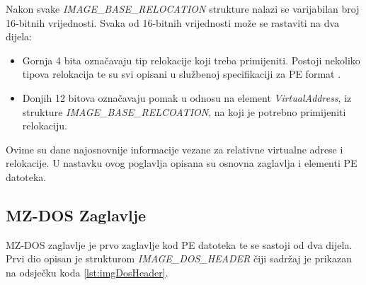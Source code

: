 \documentclass[times, utf8, diplomski, numeric]{fer}
\begin{document}
Nakon svake \emph{IMAGE\_BASE\_RELOCATION} strukture nalazi se varijabilan broj 16-bitnih vrijednosti. Svaka od 16-bitnih vrijednosti može se rastaviti na dva dijela:
\begin{itemize}
\item Gornja 4 bita označavaju tip relokacije koji treba primijeniti. Postoji nekoliko tipova relokacija te su svi opisani u službenoj specifikaciji za PE format \citep{pe_spec}.
\item Donjih 12 bitova označavaju pomak u odnosu na element \emph{VirtualAddress}, iz strukture \emph{IMAGE\_BASE\_RELCOATION}, na koji je potrebno primijeniti relokaciju.
\end{itemize}
Ovime su dane najosnovnije informacije vezane za relativne virtualne adrese i relokacije. U nastavku ovog poglavlja opisana su osnovna zaglavlja i elementi PE datoteka.

\pagebreak
\subsection{MZ-DOS Zaglavlje}
MZ-DOS zaglavlje je prvo zaglavlje kod PE datoteka te se sastoji od dva dijela. Prvi dio opisan je strukturom \emph{IMAGE\_DOS\_HEADER} čiji sadržaj je prikazan na odsječku koda \ref{lst:imgDosHeader}.
\end{document}
